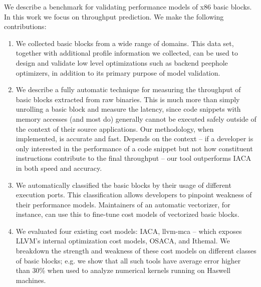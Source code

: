 We describe a benchmark for validating performance models
of x86 basic blocks.
In this work we focus on throughput prediction.
We make the following contributions:
\begin{enumerate}
\item We collected basic blocks from a wide range of domains.
This data set, together with additional profile information we collected,
can be used to design and validate low level optimizations
such as backend peephole optimizers,
in addition to its primary purpose of model validation.

\item We describe a fully automatic technique
for measuring the throughput of basic blocks extracted 
from raw binaries.
This is much more than simply unrolling a basic block
and measure the latency,
since code snippets with memory accesses (and most do)
generally cannot be executed safely
outside of the context of their source applications.
Our methodology, when implemented, is accurate and fast.
Depends on the context -- 
if a developer is only interested in the performance of a code snippet
but not how constituent instructions contribute to the final
throughput -- our tool outperforms IACA in both speed and accuracy.

\item We automatically classified the basic blocks
by their usage of different execution ports.
This classification allows developers to pinpoint weakness
of their performance models.
Maintainers of an automatic vectorizer, for instance,
can use this to fine-tune cost models
of vectorized basic blocks.

\item We evaluated four existing cost models:
IACA, llvm-mca -- 
which exposes LLVM’s internal optimization cost models,
OSACA\cite{osaca}, and Ithemal\cite{ithemal}.
We breakdown the strength and weakness of these cost models on
different classes of basic blocks;
e.g. we show that all such tools
have average error higher than 30\% 
when used to analyze numerical kernels running on Haswell machines.



\end{enumerate}